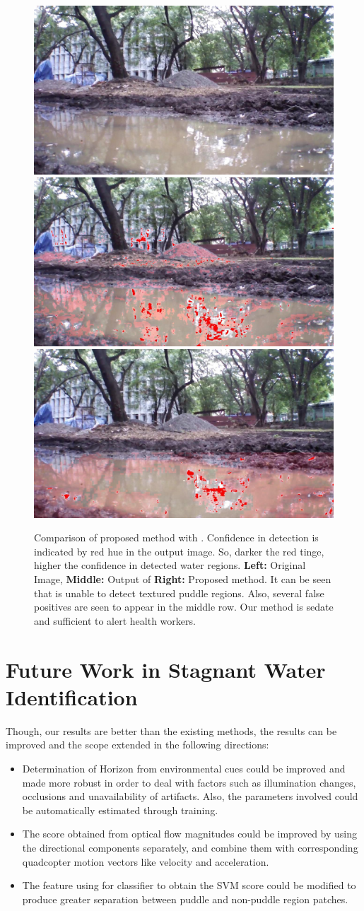 \documentclass[11pt]{article}
\begin{document}
\begin{figure}
  \includegraphics[width=0.32\linewidth]{stagnantWater/results/dataset_63full/IMG_PAIR_102_1} \hfill
  \includegraphics[width=0.32\linewidth]{stagnantWater/results/dataset_63full/output_102_jpl2} \hfill
  \includegraphics[width=0.32\linewidth]{stagnantWater/results/dataset_63full/output_102}
  	
  \caption{Comparison of proposed method with \cite{rankin2004daytime}. Confidence in detection is indicated by red hue in the output image. 
So, darker the red tinge, higher the confidence in detected water regions. \textbf{Left:} Original Image,
    \textbf{Middle:} Output of \cite{rankin2004daytime} \textbf{Right:}
    Proposed method. It can be seen that \cite{rankin2004daytime} is unable to
    detect textured puddle regions. Also, several false positives are
    seen to appear in the middle row.  Our method is sedate and
    sufficient to alert health workers.}
\label{fig:comparison}
\end{figure}

\section{Future Work in Stagnant Water Identification}
Though, our results are better than the existing methods, the results can be improved and the scope
extended in the following directions:
\begin{itemize}
  \item Determination of Horizon from environmental cues could be improved and made
  more robust in order to deal with factors such as illumination changes,
  occlusions and unavailability of artifacts. Also, the parameters involved
  could be automatically estimated through training.
  \item The score obtained from optical flow magnitudes could be improved by
  using the directional components separately, and combine them with
  corresponding quadcopter motion vectors like velocity and acceleration.
  \item The feature using for classifier to obtain the SVM score could be
  modified to produce greater separation between puddle and non-puddle region
  patches.
\end{itemize}
\newpage


\end{document}
